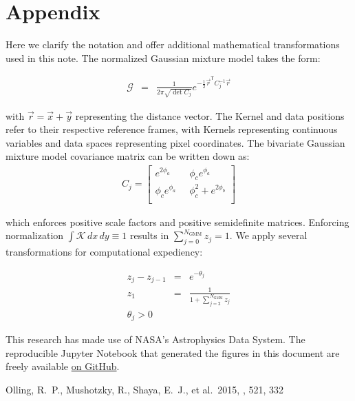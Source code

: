 \documentclass{rnaastex}
\newcommand{\trans}{\mathsf{T}}
\begin{document}
\section{Appendix}

Here we clarify the notation and offer additional mathematical transformations used in this note.  The normalized Gaussian mixture model takes the form:

\begin{eqnarray}
\mathcal{G} &=& \frac{1}{2 \pi \sqrt{\det{C_j} }} e^{-\frac{1}{2} \vec{r}^{\trans} C_j^{-1} \vec{r}}
\end{eqnarray}

with $\vec{r}=\vec{x}+\vec{y}$ representing the distance vector.  The Kernel and data positions refer to their respective reference frames, with Kernels representing continuous variables and data spaces representing pixel coordinates.  The bivariate Gaussian mixture model covariance matrix can be written down as:
\begin{eqnarray}
   C_j=
  \left[ {\begin{array}{cc}
   e^{2 \phi_a} & \;\;\phi_c e^{\phi_a} \\
   \phi_c e^{\phi_a} & \;\;\phi_c^2 +e^{2\phi_b} \\
  \end{array} } \right]
\end{eqnarray}

which enforces positive scale factors and positive semidefinite matrices.  Enforcing normalization $\int \mathcal{K} \,dx\,dy \equiv 1$ results in $\sum_{j=0}^{N_{\mathrm{GMM}}} z_j = 1$.  We apply several transformations for computational expediency:

\begin{eqnarray}
z_j - z_{j-1} &=& e^{-\theta_j} \\
z_1 &=& \frac{1}{1 + \sum_{j=2}^{N_{\mathrm{GMM}}} z_j} \\
\theta_{j} >0
\end{eqnarray}


\acknowledgments

This research has made use of NASA's Astrophysics Data System.  The reproducible Jupyter Notebook that generated the figures in this document are freely available \href{https://github.com/gully/quigly}{on GitHub}.

\begin{thebibliography}{}

 Olling, R.~P., Mushotzky, R., Shaya, E.~J., et al.\ 2015, \nat, 521, 332

\end{thebibliography}
\end{document}
